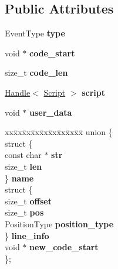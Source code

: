 \subsection*{Public Attributes}
\begin{DoxyCompactItemize}
\item 
\hypertarget{structv8_1_1_jit_code_event_ace1fbc4119ac3ef609d8e0f89cbc2c9f}{}Event\+Type {\bfseries type}\label{structv8_1_1_jit_code_event_ace1fbc4119ac3ef609d8e0f89cbc2c9f}

\item 
\hypertarget{structv8_1_1_jit_code_event_aeeac614e6c125bf08bf785b070090d0f}{}void $\ast$ {\bfseries code\+\_\+start}\label{structv8_1_1_jit_code_event_aeeac614e6c125bf08bf785b070090d0f}

\item 
\hypertarget{structv8_1_1_jit_code_event_ad56f78749d03f5db29ed417c2f3b4666}{}size\+\_\+t {\bfseries code\+\_\+len}\label{structv8_1_1_jit_code_event_ad56f78749d03f5db29ed417c2f3b4666}

\item 
\hypertarget{structv8_1_1_jit_code_event_ab877a92e8159f157345f34fa809d487e}{}\hyperlink{classv8_1_1_handle}{Handle}$<$ \hyperlink{classv8_1_1_script}{Script} $>$ {\bfseries script}\label{structv8_1_1_jit_code_event_ab877a92e8159f157345f34fa809d487e}

\item 
\hypertarget{structv8_1_1_jit_code_event_a90597e06440ebd68fe582bd1361d6de6}{}void $\ast$ {\bfseries user\+\_\+data}\label{structv8_1_1_jit_code_event_a90597e06440ebd68fe582bd1361d6de6}

\item 
\hypertarget{structv8_1_1_jit_code_event_af7964de4fa0dd0e4cf77749493ab606c}{}\begin{tabbing}
xx\=xx\=xx\=xx\=xx\=xx\=xx\=xx\=xx\=\kill
union \{\\
\>struct \{\\
\>\>const char $\ast$ {\bfseries str}\\
\>\>size\_t {\bfseries len}\\
\>\} {\bfseries name}\\
\>struct \{\\
\>\>size\_t {\bfseries offset}\\
\>\>size\_t {\bfseries pos}\\
\>\>PositionType {\bfseries position\_type}\\
\>\} {\bfseries line\_info}\\
\>void $\ast$ {\bfseries new\_code\_start}\\
\}; \label{structv8_1_1_jit_code_event_af7964de4fa0dd0e4cf77749493ab606c}
\\

\end{tabbing}\end{DoxyCompactItemize}


